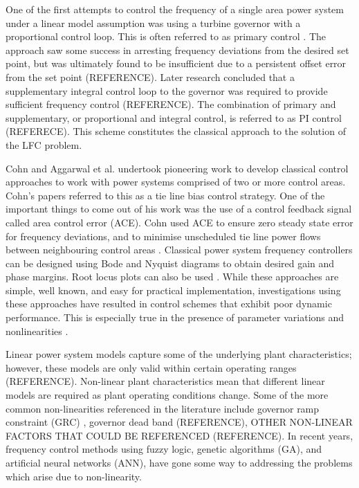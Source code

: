 One of the first attempts to control the frequency of a single area power system under a linear model assumption was using a turbine governor with a proportional control loop. This is often referred to as primary control \cite{Bevrani2011}. The approach saw some success in arresting frequency deviations from the desired set point, but was ultimately found to be insufficient due to a persistent offset error from the set point (REFERENCE). Later research concluded that a supplementary integral control loop to the governor was required to provide sufficient frequency control (REFERENCE). The combination of primary and supplementary, or proportional and integral control, is referred to as PI control (REFERECE). This scheme constitutes the classical approach to the solution of the LFC problem.

Cohn \cite{Cohn1971} and Aggarwal et al. \cite{Aggarwal1968, Aggarwal1968a} undertook pioneering work to develop classical control approaches to work with power systems comprised of two or more control areas. Cohn's papers referred to this as a tie line bias control strategy. One of the important things to come out of his work was the use of a control feedback signal called area control error (ACE). Cohn used ACE to ensure zero steady state error for frequency deviations, and to minimise unscheduled tie line power flows between neighbouring control areas \cite{Cohn1956}. Classical power system frequency controllers can be designed using Bode and Nyquist diagrams to obtain desired gain and phase margins. Root locus plots can also be used \cite{Ogat2010}. While these approaches are simple, well known, and easy for practical implementation, investigations using these approaches have resulted in control schemes that exhibit poor dynamic performance. This is especially true in the presence of parameter variations and nonlinearities \cite{Kundur1994, Elgerd1970, Bechert1977}.

Linear power system models capture some of the underlying plant characteristics; however, these models are only valid within certain operating ranges (REFERENCE). Non-linear plant characteristics mean that different linear models are required as plant operating conditions change. Some of the more common non-linearities referenced in the literature include governor ramp constraint (GRC) \cite{Kwatny1975, Elgerd1994}, governor dead band (REFERENCE), OTHER NON-LINEAR FACTORS THAT COULD BE REFERENCED (REFERENCE). In recent years, frequency control methods using fuzzy logic, genetic algorithms (GA), and artificial neural networks (ANN), have gone some way to addressing the problems which arise due to non-linearity.

